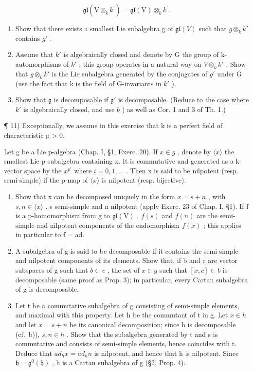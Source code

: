 \[
\mathfrak {g l} (\mathrm{V} \otimes_ {k} k ^ {\prime}) = \mathfrak {g l} (\mathrm{V}) \otimes_ {k} k ^ {\prime}.
\]

\begin{enumerate}
\def\labelenumi{\alph{enumi})}
\item
  Show that there exists a smallest Lie subalgebra g of \(\mathfrak{gl}(V)\) such that \(g\otimes_{k}k'\) contains \(g'\) .
\item
  Assume that \(k'\) is algebraically closed and denote by G the group of k-automorphisms of \(k'\) ; this group operates in a natural way on \(V \otimes_{k} k'\) . Show that \(g \otimes_{k} k'\) is the Lie subalgebra generated by the conjugates of \(g'\) under G (use the fact that k is the field of G-invariants in \(k'\) ).
\item
  Show that \(\mathfrak{g}\) is decomposable if \(\mathfrak{g}'\) is decomposable. (Reduce to the case where \(k'\) is algebraically closed, and use \(b\) ) as well as Cor. 1 and 3 of Th. 1.)
\end{enumerate}

¶ 11) Exceptionally, we assume in this exercise that k is a perfect field of characteristic p \textgreater{} 0.

Let g be a Lie p-algebra (Chap. I, §1, Exerc. 20). If \(x \in g\) , denote by \(\langle x \rangle\) the smallest Lie p-subalgebra containing x. It is commutative and generated as a k-vector space by the \(x^{p^{i}}\) where \(i = 0, 1, \ldots\) . Then x is said to be nilpotent (resp. semi-simple) if the p-map of \(\langle x \rangle\) is nilpotent (resp. bijective).

\begin{enumerate}
\def\labelenumi{\alph{enumi})}
\item
  Show that x can be decomposed uniquely in the form \(x = s + n\) , with \(s, n \in \langle x \rangle\) , s semi-simple and n nilpotent (apply Exerc. 23 of Chap. I, §1). If f is a p-homomorphism from g to \(\mathfrak{gl}(\mathrm{V})\) , \(f(s)\) and \(f(n)\) are the semi-simple and nilpotent components of the endomorphism \(f(x)\) ; this applies in particular to f = ad.
\item
  A subalgebra of g is said to be decomposable if it contains the semi-simple and nilpotent components of its elements. Show that, if b and c are vector subspaces of g such that \(b \subset c\) , the set of \(x \in g\) such that \([x, c] \subset b\) is decomposable (same proof as Prop. 3); in particular, every Cartan subalgebra of g is decomposable.
\item
  Let t be a commutative subalgebra of g consisting of semi-simple elements, and maximal with this property. Let h be the commutant of t in g. Let \(x \in h\) and let \(x = s + n\) be its canonical decomposition; since h is decomposable (cf.~b)), \(s, n \in h\) . Show that the subalgebra generated by t and s is commutative and consists of semi-simple elements, hence coincides with t. Deduce that \(ad_{h}x = ad_{h}n\) is nilpotent, and hence that h is nilpotent. Since \(\mathfrak{h} = \mathfrak{g}^{0}(\mathfrak{h})\) , h is a Cartan subalgebra of g (§2, Prop. 4).
\end{enumerate}

